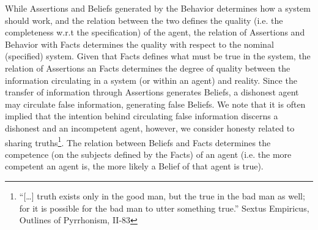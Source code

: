 While Assertions and Beliefs generated by the Behavior determines how a system should work, and the
relation between the two defines the quality (i.e. the completeness w.r.t the specification) of the agent, the relation of
Assertions and Behavior with Facts determines the quality with respect to the
nominal (specified) system.  Given that Facts defines what must be true in the
system, the relation of Assertions an Facts
determines the degree of quality between the information circulating in a
system (or within an agent) and reality.
Since the transfer of information through Assertions
generates Beliefs, a dishonest agent may circulate false information,
generating false Beliefs.  We note that it is often implied that the intention behind
circulating false information discerns a dishonest and an incompetent agent,
however, we consider honesty related to sharing truths\footnote{``[\ldots] truth
exists only in the good man, but the true in the bad man as well; for it is
possible for the bad man to utter something true.''
Sextus Empiricus, Outlines of Pyrrhonism, II-83\autocite{Empiricus1990Pyrrhonism}}.  The
relation between Beliefs and Facts determines the competence (on the subjects
defined by the Facts) of an agent (i.e. the more competent an agent is, the
more likely a Belief of that agent is true).

